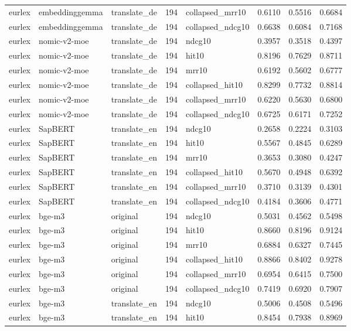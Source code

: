 \begin{tabular}{lllrlrrr}
eurlex & embeddinggemma & translate\_de & 194 & collapsed\_mrr10 & 0.6110 & 0.5516 & 0.6684 \\
eurlex & embeddinggemma & translate\_de & 194 & collapsed\_ndcg10 & 0.6638 & 0.6084 & 0.7168 \\
eurlex & nomic-v2-moe & translate\_de & 194 & ndcg10 & 0.3957 & 0.3518 & 0.4397 \\
eurlex & nomic-v2-moe & translate\_de & 194 & hit10 & 0.8196 & 0.7629 & 0.8711 \\
eurlex & nomic-v2-moe & translate\_de & 194 & mrr10 & 0.6192 & 0.5602 & 0.6777 \\
eurlex & nomic-v2-moe & translate\_de & 194 & collapsed\_hit10 & 0.8299 & 0.7732 & 0.8814 \\
eurlex & nomic-v2-moe & translate\_de & 194 & collapsed\_mrr10 & 0.6220 & 0.5630 & 0.6800 \\
eurlex & nomic-v2-moe & translate\_de & 194 & collapsed\_ndcg10 & 0.6725 & 0.6171 & 0.7252 \\
eurlex & SapBERT & translate\_en & 194 & ndcg10 & 0.2658 & 0.2224 & 0.3103 \\
eurlex & SapBERT & translate\_en & 194 & hit10 & 0.5567 & 0.4845 & 0.6289 \\
eurlex & SapBERT & translate\_en & 194 & mrr10 & 0.3653 & 0.3080 & 0.4247 \\
eurlex & SapBERT & translate\_en & 194 & collapsed\_hit10 & 0.5670 & 0.4948 & 0.6392 \\
eurlex & SapBERT & translate\_en & 194 & collapsed\_mrr10 & 0.3710 & 0.3139 & 0.4301 \\
eurlex & SapBERT & translate\_en & 194 & collapsed\_ndcg10 & 0.4184 & 0.3606 & 0.4771 \\
eurlex & bge-m3 & original & 194 & ndcg10 & 0.5031 & 0.4562 & 0.5498 \\
eurlex & bge-m3 & original & 194 & hit10 & 0.8660 & 0.8196 & 0.9124 \\
eurlex & bge-m3 & original & 194 & mrr10 & 0.6884 & 0.6327 & 0.7445 \\
eurlex & bge-m3 & original & 194 & collapsed\_hit10 & 0.8866 & 0.8402 & 0.9278 \\
eurlex & bge-m3 & original & 194 & collapsed\_mrr10 & 0.6954 & 0.6415 & 0.7500 \\
eurlex & bge-m3 & original & 194 & collapsed\_ndcg10 & 0.7419 & 0.6920 & 0.7907 \\
eurlex & bge-m3 & translate\_en & 194 & ndcg10 & 0.5006 & 0.4508 & 0.5496 \\
eurlex & bge-m3 & translate\_en & 194 & hit10 & 0.8454 & 0.7938 & 0.8969 \\

\end{tabular}

